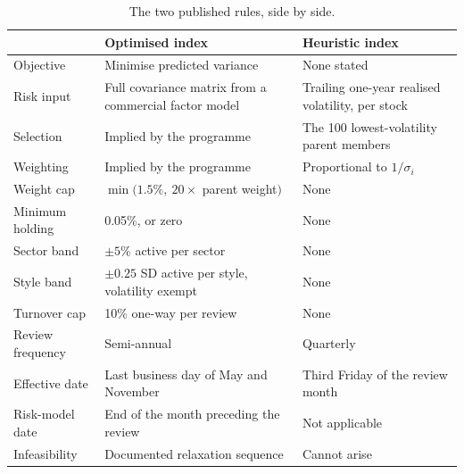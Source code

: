 \begin{table}[tbp]
\caption{The two published rules, side by side.}
\label{tab:rules}
\centering\small
\setlength{\tabcolsep}{5pt}
\begin{tabularx}{\textwidth}{@{}lYY@{}}
\toprule
 & Optimised index & Heuristic index\\
\midrule
Objective        & Minimise predicted variance & None stated\\
Risk input       & Full covariance matrix from a commercial factor model
                 & Trailing one-year realised volatility, per stock\\
Selection        & Implied by the programme & The 100 lowest-volatility
                   parent members\\
Weighting        & Implied by the programme & Proportional to
                   $1/\sigma_i$\\
\addlinespace
Weight cap       & $\min(1.5\%,\ 20\times$ parent weight$)$ & None\\
Minimum holding  & 0.05\%, or zero & None\\
Sector band      & $\pm5\%$ active per sector & None\\
Style band       & $\pm0.25$ SD active per style, volatility exempt & None\\
Turnover cap     & 10\% one-way per review & None\\
\addlinespace
Review frequency & Semi-annual & Quarterly\\
Effective date   & Last business day of May and November
                 & Third Friday of the review month\\
Risk-model date  & End of the month preceding the review & Not applicable\\
Infeasibility    & Documented relaxation sequence & Cannot arise\\
\bottomrule
\end{tabularx}
\end{table}
